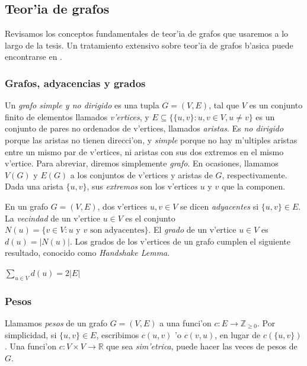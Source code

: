 \subsection{Teor'ia de grafos}

Revisamos los conceptos fundamentales de teor'ia de grafos que usaremos a lo largo de la tesis. Un tratamiento extensivo sobre teor'ia de grafos b'asica puede encontrarse en \cite{Gr05}.

\subsubsection*{Grafos, adyacencias y grados}

Un \textit{grafo simple y no dirigido} es una tupla $G = (V, E)$, tal que $V$ es un conjunto finito de elementos llamados \textit{v'ertices}, y $E \subseteq \{\{u, v\}: u, v \in V, u \neq v\}$ es un conjunto de pares no ordenados de v'ertices, llamados \textit{aristas}. Es \textit{no dirigido} porque las aristas no tienen direcci'on, y \textit{simple} porque no hay m'ultiples aristas entre un mismo par de v'ertices, ni aristas con sus dos extremos en el mismo v'ertice. Para abreviar, diremos simplemente \textit{grafo}. En ocasiones, llamamos $V(G)$ y $E(G)$ a los conjuntos de v'ertices y aristas de $G$, respectivamente. Dada una arista $\{u, v\}$, sus \textit{extremos} son los v'ertices $u$ y $v$ que la componen.

En un grafo $G = (V, E)$, dos v'ertices $u, v \in V$ se dicen \textit{adyacentes} si $\{u, v\} \in E$. La \textit{vecindad} de un v'ertice $u \in V$ es el conjunto $N(u) = \{v \in V: u \text{ y } v \text{ son adyacentes}\}$. El \textit{grado} de un v'ertice $u \in V$ es $d(u) = |N(u)|$. Los grados de los v'ertices de un grafo cumplen el siguiente resultado, conocido como \textit{Handshake Lemma}.

\begin{lemma}
$\sum_{u \in V} d(u) = 2|E|$
\end{lemma}

\subsubsection*{Pesos}

Llamamos \textit{pesos} de un grafo $G = (V, E)$ a una funci'on $c: E \to \mathbb{Z}_{\geq 0}$. Por simplicidad, si $\{u, v\} \in E$, escribimos $c(u, v)$ 'o $c(v, u)$, en lugar de $c(\{u, v\})$. Una funci'on $c: V \times V \to \mathbb{R}$ que sea \emph{sim'etrica}, puede hacer las veces de pesos de $G$.

